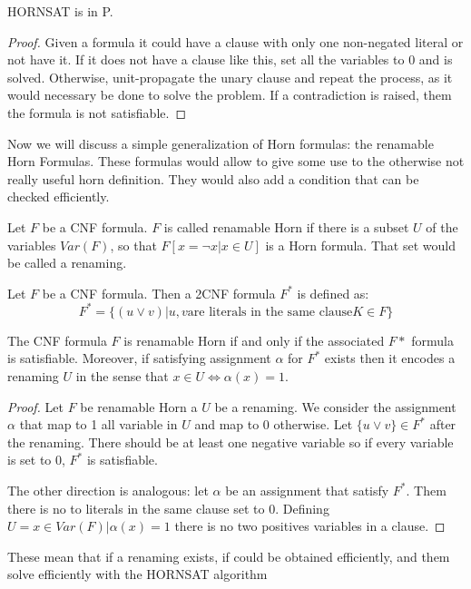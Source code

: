 \begin{proposition}
  HORNSAT is in P.
\end{proposition}
\begin{proof}
  Given a formula it could have a clause with only one non-negated literal or not have it. If it does not have a clause like this, set all the variables to 0 and is solved. Otherwise, unit-propagate the unary clause and repeat the process, as it would necessary be done to solve the problem. If a contradiction is raised, them the formula is not satisfiable.
\end{proof}


Now we will discuss a simple generalization of Horn formulas: the renamable Horn Formulas. These formulas would allow to give some use to the otherwise not really useful horn definition. They would also add a condition that can be checked efficiently.

\begin{definition}
  Let $F$ be a CNF formula. $F$ is called renamable Horn if there is a subset $U$ of the variables $Var(F)$, so that $F[x=\neg x | x \in U]$ is a Horn formula.
  That set would be called a renaming.
\end{definition}


\begin{definition}
  Let $F$ be a CNF formula. Then a 2CNF formula $F^*$ is defined as:
  $$F^* = \{(u \vee v) | u,v \text{are literals in the same clause} K \in F \}$$
\end{definition}


\begin{theorem}
  The CNF formula $F$ is renamable Horn if and only if the associated $F*$ formula is satisfiable. Moreover, if satisfying assignment $\alpha$ for $F^*$  exists then it encodes a renaming $U$ in the sense that $x \in U \iff \alpha(x) = 1$.
\end{theorem}
\begin{proof}
  Let $F$ be renamable Horn a $U$ be a renaming. We consider the assignment $\alpha$ that map to 1 all variable in $U$ and map to 0 otherwise. Let $\{u\vee v\} \in F^*$ after the renaming. There should be at least one negative variable so if every variable is set to 0, $F^*$ is satisfiable.

  The other direction is analogous: let $\alpha$ be an assignment that satisfy $F^*$. Them there is no to literals in the same clause set to 0. Defining $U=  {x \in Var(F) | \alpha(x) = 1}$ there is no two positives variables in a clause.
  \end{proof}


These mean that if a renaming exists, if could be obtained efficiently, and them solve efficiently with the HORNSAT algorithm






